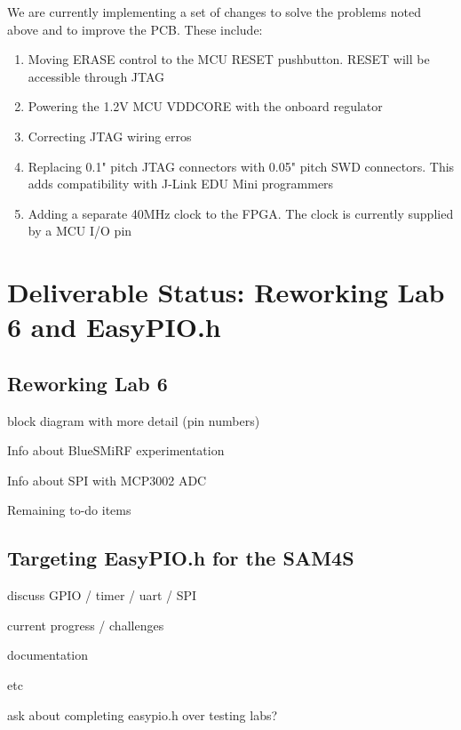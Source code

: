 \documentclass[12pt]{article}
\begin{document}
We are currently implementing a set of changes to solve the problems noted above and to improve the PCB. These include:

\begin{enumerate}
	\item Moving ERASE control to the MCU RESET pushbutton. RESET will be accessible through JTAG
	\item Powering the 1.2V MCU VDDCORE with the onboard regulator
	\item Correcting JTAG wiring erros
	\item Replacing 0.1" pitch JTAG connectors with 0.05" pitch SWD connectors. This adds compatibility with J-Link EDU Mini programmers
	\item Adding a separate 40MHz clock to the FPGA. The clock is currently supplied by a MCU I/O pin
\end{enumerate}

\newpage
\section{Deliverable Status: Reworking Lab 6 and EasyPIO.h}

\subsection{Reworking Lab 6}

block diagram with more detail (pin numbers)

Info about BlueSMiRF experimentation

Info about SPI with MCP3002 ADC

Remaining to-do items

\subsection{Targeting EasyPIO.h for the SAM4S}

discuss GPIO / timer / uart / SPI

current progress / challenges

documentation

etc

ask about completing easypio.h over testing labs?


	
\end{document}
